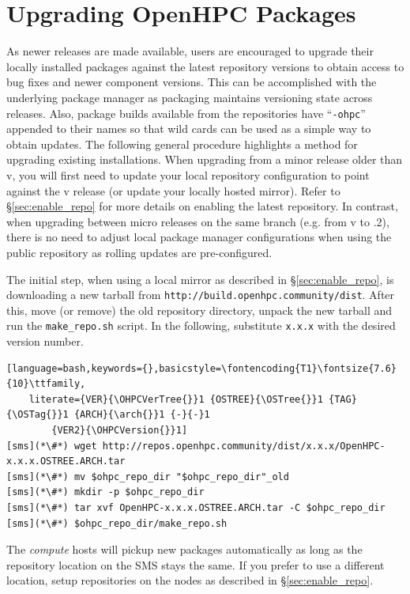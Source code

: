 \section{Upgrading OpenHPC Packages}  \label{appendix:upgrade}


As newer \OHPC{} releases are made available, users are encouraged to upgrade
their locally installed packages against the latest repository versions to
obtain access to bug fixes and newer component versions. This can be
accomplished with the underlying package manager as \OHPC{} packaging maintains
versioning state across releases. Also, package builds available from the
\OHPC{} repositories have ``\texttt{-ohpc}'' appended to their names so that
wild cards can be used as a simple way to obtain updates. The following general
procedure highlights a method for upgrading existing installations.
When upgrading from a minor release older than v\OHPCVerTree{}, you will first
need to update your local \OHPC{} repository configuration to point against the
v\OHPCVerTree{} release (or update your locally hosted mirror). Refer to
\S\ref{sec:enable_repo} for more details on enabling the latest
repository. In contrast, when upgrading between micro releases on the same
branch (e.g. from v\OHPCVerTree{} to \OHPCVerTree{}.2), there is no need to
adjust local package manager configurations when using the public repository as
rolling updates are pre-configured.

The initial step, when using a local mirror as described in
\S\ref{sec:enable_repo}, is downloading a new tarball from \texttt{http://build.openhpc.community/dist}.
After this, move (or remove) the old repository directory, unpack
the new tarball and run the \texttt{make\_repo.sh} script. In the following,
substitute \texttt{x.x.x} with the desired version number.

\begin{lstlisting}[language=bash,keywords={},basicstyle=\fontencoding{T1}\fontsize{7.6}{10}\ttfamily,
	literate={VER}{\OHPCVerTree{}}1 {OSTREE}{\OSTree{}}1 {TAG}{\OSTag{}}1 {ARCH}{\arch{}}1 {-}{-}1
        {VER2}{\OHPCVersion{}}1]
[sms](*\#*) wget http://repos.openhpc.community/dist/x.x.x/OpenHPC-x.x.x.OSTREE.ARCH.tar
[sms](*\#*) mv $ohpc_repo_dir "$ohpc_repo_dir"_old
[sms](*\#*) mkdir -p $ohpc_repo_dir
[sms](*\#*) tar xvf OpenHPC-x.x.x.OSTREE.ARCH.tar -C $ohpc_repo_dir
[sms](*\#*) $ohpc_repo_dir/make_repo.sh
\end{lstlisting}

The {\em compute} hosts will pickup new packages automatically as long as the
repository location on the SMS stays the same. If you prefer to use a different
location, setup repositories on the nodes as described in
\S\ref{sec:enable_repo}.

